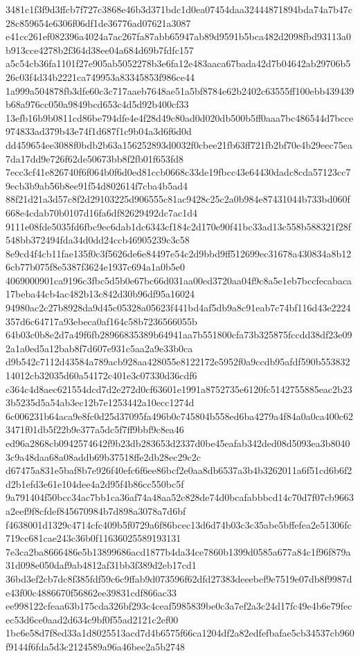 \documentclass[11pt,a4paper]{article}
\begin{document}
{3481c1f3f9d3ffcb7f727c3868e46b3d371bdc1d0ea07454daa32444871894bda74a7b47c28c859654e6306f06df1de36776ad07621a3087
e41cc261ef082396a4024a7ac267fa87abb65947ab89d9591b5bca482d2098fbd93113a0b913cce4278b2f364d38ee04a684d69b7fdfc157
a5c54cb36fa1101f27e905ab5052278b3e6fa12e483aaca67bada42d7b04642ab29706b526c03f4d34b2221ca749953a83345853f986ce44
1a999a504878fb3dfe60c3c717aaeb7648ae51a5bf8784e62b2402c63555ff100ebb439439b68a976cc050a9849bcd653c4d5d92b400cf33
13efb16b9b0811cd86be794dfe4e4f28d49c80ad0d020db500b5ff0aaa7bc486544d7bcce974833ad379b43e74f1d687f1c9b04a3d6f6d0d
dd459654ee3088f0bdb2b63a156252893d0032f0cbee21fb63ff721fb2bf70e4b29eec75ea7da17dd9e726f62de50673bb8f2fb01f653fd8
7ecc3cf41e826740f6f064b0f6d0ed81ccb0668c33de19fbcc43e64430dadc8cda57123cc79ecb3b9ab56b8ee91f54d802614f7cba4b5ad4
88f21d21a3d57c8f2d29103225d906555c81ac9428c25c2a0b984e87431044b733bd060f668e4cdab70b0107d16fa6df82629492dc7ac1d4
9111e08fde5035fd6fbc9ec6dab1dc6343cf184c2d170e90f41bc33ad13c558b588321f28f548bb372494fda34d0dd24ccb46905239c3c58
8e9cd4f4cb11fae135f0c3f5626de6e84497e54c2d9bbd9ff512699ec31678a430834a8b126cb77b075f8e5387f3624e1937c694a1a0b5e0
4069000901ca9196c3fbc5d5b0e67bc66d031aa00ed3720aa04f9c8a5e1eb7bccfecabaca17beba44cb4ac482b13c842d30b96df95a16024
94980ac2c27b8928da9d45c05328a05623f441bd4af5db9a8c91eab7c74bf116d43e2224357d6c64717a93ebeca0af164c58b7236566055b
64b03c0b8e2d7a49f6fb28966835389b64941aa7b551800cfa73b325875fccdd38df23e092a1a0ed5a12bab8f7d607e931c5aa2a9e33b0ca
d9b542c7112d43584a789acb928aa428055e8122172e5952f0a9ccdb95afdf590b55383214012cb32035d60a54172c401e3c07330d36cdf6
c364c4d8aec621554dcd7d2e272d0cf63601e1991a8752735e6120fc5142755885eac2b233b5235d5a54ab3ec12b7e1253442a10ecc1274d
6c006231b64aca9e8fc0d25d37095fa496b0c745804b558ed6ba4279a4f84a0a0ca400c623471f01db5f22b9e377a5dc5f7ff9bbf9c8ea46
ed96a2868cb0942574642f9b23db283653d2337d0be45eafab342ded08d5093ea3b80403c9a48daa68a08addb69b37518ffe2db28ec29c2c
d67475a831e5baf8b7e926f40efc6f6ee86bcf2e0aa8db6537a3b4b3262011a6f51cd6b6f2d2b1efd3e61e104dee4a2d95f4b86cc550bc5f
9a791404f50bcc34ac7bb1ca36af74a48aa52c828de74d0bcafabbbcd14c70d7f07cb9663a2eef9f8cfdef845670984b7d898a3078a7d6bf
f4638001d1329c4714cfc409b5f0729a6f86bcec13d6d74b03c3c35abe5bffefea2e51306fc719cc681cae243c36b0f11636025589193131
7e3ca2ba8666486e5b13899686acd1877b4da34ce7860b1399d0585a677a84c1f96f879a31d098e050daf9ab4812af31bb3f389d2eb17cd1
36bd3ef2cb7dc8f385fdf59c6c9ffab9d073596f62dfd27383deeebef9e7519e07db8f9987de43f00c4886670f56862ee39831cdf866ac33
ee998122cfeaa63b175cda326bf293c4ceaf5985839be0c3a7ef2a3c24d17fc49e4b6e79fecec53d6ce0aad2d634c9bf0f55ad2121c2ef00
1bc6e58d7f8ed33a1d8025513acd7d4b6575f66ca1204df2a82edfefbafae5cb34537cb960f9144f6fda5d3c2124589a96a46bee2a5b2748
}
\end{document}
